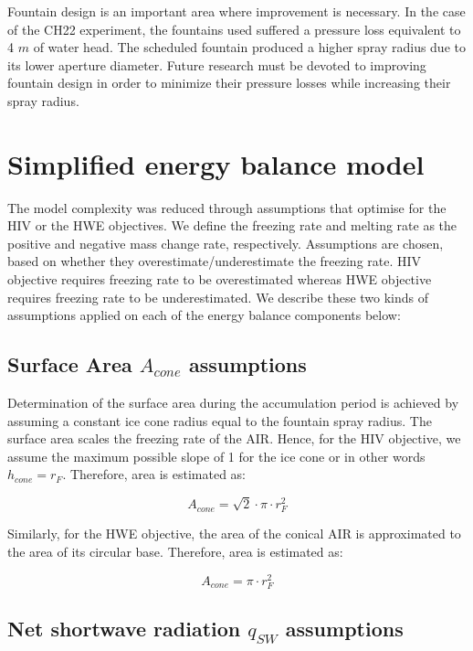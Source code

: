 \documentclass[tc, manuscript]{copernicus}
\begin{document}
Fountain design is an important area where improvement is necessary. In the case of the CH22 experiment, the
fountains used suffered a pressure loss equivalent to 4 $m$ of water head. The scheduled fountain produced a
higher spray radius due to its lower aperture diameter. Future research must be devoted to improving fountain
design in order to minimize their pressure losses while increasing their spray radius. 


\appendix

\section{Simplified energy balance model}\label{sec:SEB}

The model complexity was reduced through assumptions that optimise for the HIV or the HWE objectives. We define the freezing rate and melting rate as the positive and negative mass change
rate, respectively. Assumptions are chosen, based on whether they overestimate/underestimate the freezing rate.
HIV objective requires freezing rate to be overestimated whereas HWE objective requires freezing rate to
be underestimated. We describe these two kinds of assumptions applied on each of the energy balance components
below: 

\subsection{Surface Area $A_{cone}$ assumptions}

Determination of the surface area during the accumulation period is achieved by assuming a constant ice cone
radius equal to the fountain spray radius. The surface area scales the freezing rate of the AIR. Hence, for the
HIV objective, we assume the maximum possible slope of 1 for the ice cone or in other words $h_{cone} = r_{F}$.
Therefore, area is estimated as:  

\begin{equation} A_{cone} =\sqrt{2} \cdot \pi \cdot r_{F}^2  \end{equation}

Similarly, for the HWE objective, the area of the conical AIR is approximated to the area of its circular
base. Therefore, area is estimated as:

\begin{equation} A_{cone} =\pi \cdot r_{F}^2  \end{equation}

\subsection{Net shortwave radiation \texorpdfstring{$q_{SW}$}{Lg} assumptions}
\label{sec:SW}
\end{document}
